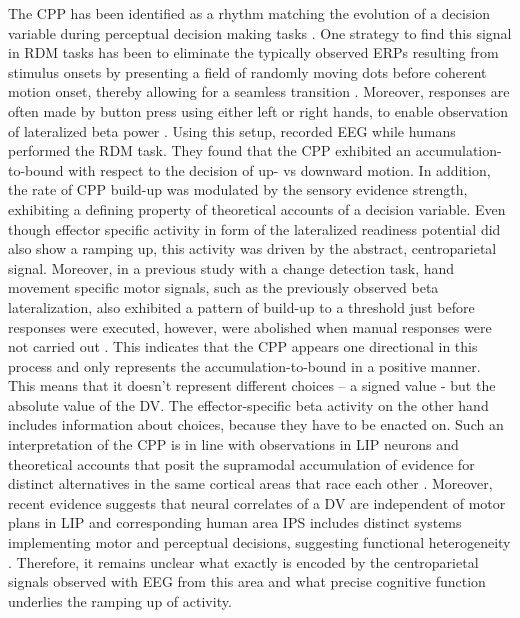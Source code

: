 The CPP has been identified as a rhythm matching the evolution of a decision variable during perceptual decision making tasks \parencite{Kelly2013,Kelly2015,Philiastides2014,Twomey2015}. One strategy to find this signal in RDM tasks has been to eliminate the typically observed ERPs resulting from stimulus onsets by presenting a field of randomly moving dots before coherent motion onset, thereby allowing for a seamless transition \parencite{Kelly2013}. Moreover, responses are often made by button press using either left or right hands, to enable observation of lateralized beta power \parencite[as in][]{DeLange2013,Donner2009}. Using this setup, \textcite{Kelly2013} recorded EEG while humans performed the RDM task. They found that the CPP exhibited an accumulation-to-bound with respect to the decision of up- vs downward motion. In addition, the rate of CPP build-up was modulated by the sensory evidence strength, exhibiting a defining property of theoretical accounts of a decision variable. Even though effector specific activity in form of the lateralized readiness potential \parencite{Eimer1998,Smulders2012} did also show a ramping up, this activity was driven by the abstract, centroparietal signal. Moreover, in a previous study with a change detection task, hand movement specific motor signals, such as the previously observed beta lateralization, also exhibited a pattern of build-up to a threshold just before responses were executed, however, were abolished when manual responses were not carried out \parencite{OConnell2012}. This indicates that the CPP appears one directional in this process and only represents the accumulation-to-bound in a positive manner. This means that it doesn’t represent different choices – a signed value - but the absolute value of the DV. The effector-specific beta activity on the other hand includes information about choices, because they have to be enacted on. Such an interpretation of the CPP  is in line with observations in LIP neurons and theoretical accounts that posit the supramodal accumulation of evidence for distinct alternatives in the same cortical areas that race each other \parencite{Brown2008,Roitman2002,Usher2001}. Moreover, recent evidence suggests that neural correlates of a DV are independent of motor plans in LIP \parencite{Bennur2011} and corresponding human area IPS includes distinct systems implementing motor and perceptual decisions, suggesting functional heterogeneity \parencite{Filimon2013}. Therefore, it remains unclear what exactly is encoded by the centroparietal signals observed with EEG from this area and what precise cognitive function underlies the ramping up of activity.


